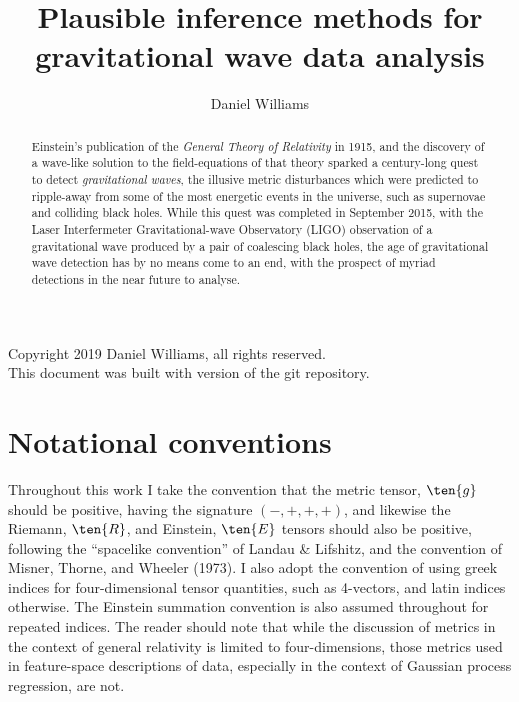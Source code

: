 \documentclass{kentigern}
\title{Plausible inference methods for gravitational wave data analysis}
\author{Daniel Williams}
\theoremstyle{definition}
\begin{document}
\openleft
\frontmatter
\thesistitle

\begin{abstract}
  Einstein's publication of the \textit{General Theory of Relativity} in 1915, and the discovery of a wave-like solution to the field-equations of that theory sparked a century-long quest to detect \textit{gravitational waves},
  the illusive metric disturbances which were predicted to ripple-away from some of the most energetic events in the universe, such as supernovae and colliding black holes.
  While this quest was completed in September 2015, with the Laser Interfermeter Gravitational-wave Observatory (LIGO) observation of a gravitational wave produced by a pair of coalescing black holes,
  the age of gravitational wave detection has by no means come to an end,
  with the prospect of myriad detections in the near future to analyse.
\end{abstract}
\newpage

Copyright 2019 Daniel Williams, all rights reserved.\\

This document was built with version  of the git repository.

\newpage
\tableofcontents
\newpage
\listoffigures
\newpage
\listoftables

\newpage


\section{Notational conventions}
\label{sec:notation-conventions}

Throughout this work I take the convention that the metric tensor, $\ten{g}$ should be positive, having the signature $(-,+,+,+)$, and likewise the Riemann, $\ten{R}$, and Einstein, $\ten{E}$ tensors should also be positive, following the ``spacelike convention'' of Landau \& Lifshitz, and the convention of Misner, Thorne, and Wheeler (1973). I also adopt the convention of using greek indices for four-dimensional tensor quantities, such as 4-vectors, and latin indices otherwise. The Einstein summation convention is also assumed throughout for repeated indices. The reader should note that while the discussion of metrics in the context of general relativity is limited to four-dimensions, those metrics used in feature-space descriptions of data, especially in the context of Gaussian process regression, are not. 
\end{document}
